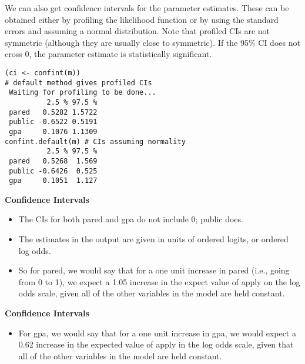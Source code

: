 \documentclass[00-GLMregslides.tex]{subfiles}
\begin{document}
	
\begin{frame}
	\Large
We can also get confidence intervals for the parameter estimates. These can be obtained either by profiling the likelihood function or by using the standard errors and assuming a normal distribution. Note that profiled CIs are not symmetric (although they are usually close to symmetric). If the 95\% CI does not cross 0, the parameter estimate is statistically significant.
\end{frame}
\begin{frame}[fragile]
	\begin{verbatim}
(ci <- confint(m)) 
# default method gives profiled CIs
 Waiting for profiling to be done...
          2.5 % 97.5 %
 pared   0.5282 1.5722
 public -0.6522 0.5191
 gpa     0.1076 1.1309
confint.default(m) # CIs assuming normality
          2.5 % 97.5 %
 pared   0.5268  1.569
 public -0.6426  0.525
 gpa     0.1051  1.127
\end{verbatim}
\end{frame}
\begin{frame}
\textbf{Confidence Intervals}
\begin{itemize}
\item The CIs for both pared and gpa do not include 0; public does. 
\item The estimates in the output are given in units of ordered logits, or ordered log odds. 
\item So for pared, we would say that for a one unit increase in pared (i.e., going from 0 to 1), we expect a 1.05 
increase in the expect value of apply on the log odds scale, given all of the other variables in the model are held constant. 
\end{itemize}
\end{frame}
\begin{frame}
\textbf{Confidence Intervals}
\begin{itemize}
\item For gpa, we would say that for a one unit increase in gpa, we would expect a 0.62 increase in the expected value of 
apply in the log odds scale, given that all of the other variables in the model are held constant.
\end{itemize}
\end{frame}
\end{document}
